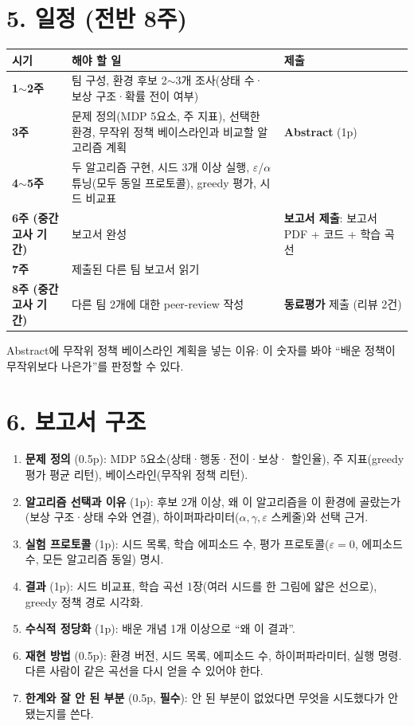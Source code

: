 \documentclass[12pt]{article}
\begin{document}
\section*{5. 일정 (전반 8주)}
\begin{center}
\small
\begin{tabular}{@{}p{3.6cm}p{5.4cm}p{3.7cm}@{}}
\toprule
\textbf{시기} & \textbf{해야 할 일} & \textbf{제출} \\
\midrule
\textbf{1$\sim$2주} & 팀 구성, 환경 후보 2$\sim$3개 조사(상태 수·보상 구조·확률 전이 여부) &  \\
\textbf{3주} & 문제 정의(MDP 5요소, 주 지표), 선택한 환경, 무작위 정책 베이스라인과 비교할 알고리즘 계획 & \textbf{Abstract} (1p) \\
\textbf{4$\sim$5주} & 두 알고리즘 구현, 시드 3개 이상 실행, $\varepsilon$/$\alpha$ 튜닝(모두 동일 프로토콜), greedy 평가, 시드 비교표 &  \\
\textbf{6주 (중간고사 기간)} & 보고서 완성 & \textbf{보고서 제출}: 보고서 PDF + 코드 + 학습 곡선 \\
\textbf{7주} & 제출된 다른 팀 보고서 읽기 &  \\
\textbf{8주 (중간고사 기간)} & 다른 팀 2개에 대한 peer-review 작성 & \textbf{동료평가} 제출 (리뷰 2건) \\
\bottomrule
\end{tabular}
\end{center}
\vspace{4pt}
Abstract에 무작위 정책 베이스라인 계획을 넣는 이유: 이 숫자를 봐야 ``배운 정책이 무작위보다 나은가''를 판정할 수 있다.

\section*{6. 보고서 구조}
\begin{enumerate}
\item \textbf{문제 정의} (0.5p): MDP 5요소(상태·행동·전이·보상·
  할인율), 주 지표(greedy 평가 평균 리턴), 베이스라인(무작위
  정책 리턴).
\item \textbf{알고리즘 선택과 이유} (1p): 후보 2개 이상, 왜 이
  알고리즘을 이 환경에 골랐는가(보상 구조·상태 수와 연결),
  하이퍼파라미터($\alpha,\gamma,\varepsilon$ 스케줄)와 선택 근거.
\item \textbf{실험 프로토콜} (1p): 시드 목록, 학습 에피소드 수,
  평가 프로토콜($\varepsilon=0$, 에피소드 수, 모든 알고리즘 동일)
  명시.
\item \textbf{결과} (1p): 시드 비교표, 학습 곡선 1장(여러 시드를
  한 그림에 얇은 선으로), greedy 정책 경로 시각화.
\item \textbf{수식적 정당화} (1p): 배운 개념 1개 이상으로 ``왜
  이 결과''.
\item \textbf{재현 방법} (0.5p): 환경 버전, 시드 목록, 에피소드 수, 하이퍼파라미터, 실행 명령. 다른 사람이 같은 곡선을 다시 얻을 수 있어야 한다.
\item \textbf{한계와 잘 안 된 부분} (0.5p, \textbf{필수}):
  안 된 부분이 없었다면 무엇을 시도했다가 안 됐는지를 쓴다.
\end{enumerate}
\end{document}
